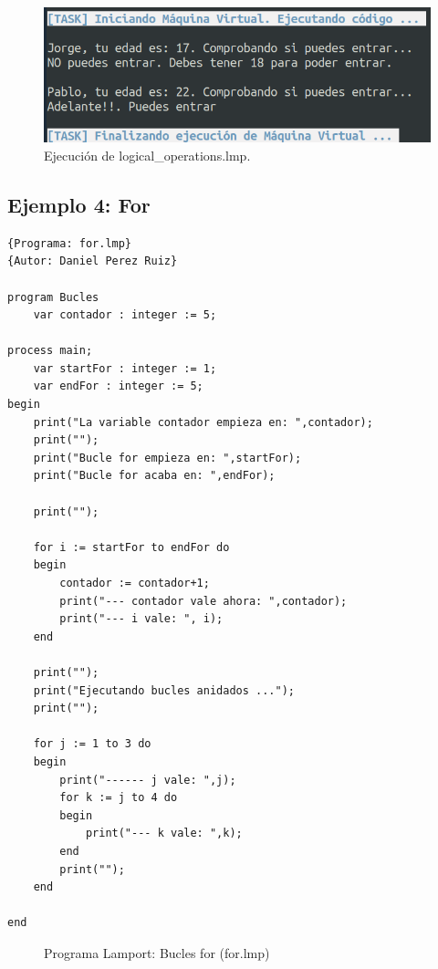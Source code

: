 \newpage
\begin{figure}[h]
    \includegraphics[width=\linewidth]{images/ejemplos/if_else.png}
    \caption{Ejecución de logical\_operations.lmp.}
    \label{fig:lamportIfElse_exec}
\end{figure}

\newpage
\subsection{Ejemplo 4: For}
\begin{lstlisting}[style=lamportStyle]
{Programa: for.lmp}
{Autor: Daniel Perez Ruiz}

program Bucles
	var contador : integer := 5;

process main;
	var startFor : integer := 1;
	var endFor : integer := 5;
begin
	print("La variable contador empieza en: ",contador);
	print("");
	print("Bucle for empieza en: ",startFor);
	print("Bucle for acaba en: ",endFor);
	
	print("");
	
	for i := startFor to endFor do
	begin
		contador := contador+1;
		print("--- contador vale ahora: ",contador);
		print("--- i vale: ", i);
	end
	
	print("");
	print("Ejecutando bucles anidados ...");
	print("");
	
	for j := 1 to 3 do
	begin
		print("------ j vale: ",j);
		for k := j to 4 do
		begin
			print("--- k vale: ",k);
		end
		print("");
	end
	
end
\end{lstlisting}
\begin{figure}[h]
\caption{Programa Lamport: Bucles for (for.lmp)}
\label{fig:lamportFor}
\end{figure}

